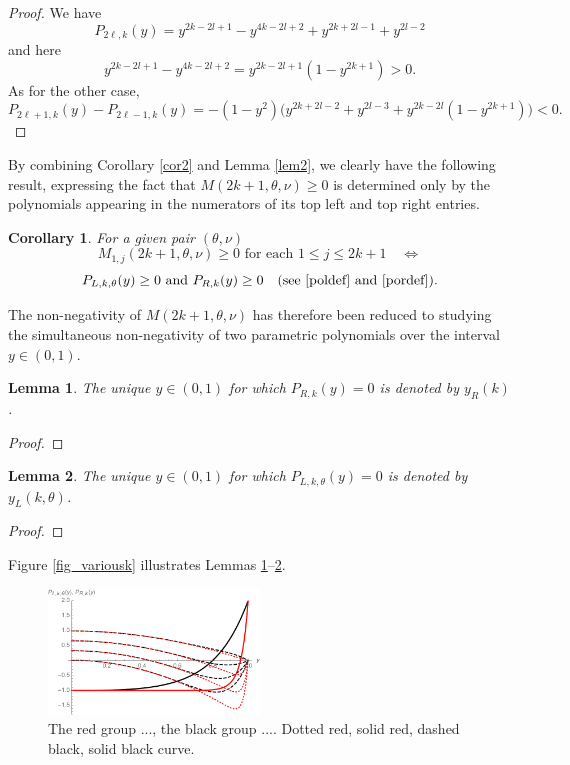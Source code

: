 \documentclass[a4paper]{article}
\newtheorem{lemma}{Lemma}
\newtheorem{corollary}{Corollary}
\newcommand{\te}{\theta}
\newcommand{\yl}{y_L(k,\theta)}
\newcommand{\yr}{y_R(k)}
\newcommand{\Por}{P_{R,k}(y)}
\newcommand{\Pol}{P_{L,k,\te}(y)}
\begin{document}
\begin{proof} We have
\[
P_{2\ell,k}(y)=y^{2 k-2 l+1}-y^{4 k-2 l+2}+y^{2 k+2 l-1}+y^{2 l-2}\]
and here 
\[
y^{2 k-2 l+1}-y^{4 k-2 l+2}=y^{2 k-2 l+1}(1-y^{2 k+1})>0.
\]
As for the other case,
\[
P_{2\ell+1,k}(y)-P_{2\ell-1,k}(y)=-(1 - y^2)\Big(y^{2 k+2 l-2}+y^{2 l-3}+y^{2 k-2 l}(1-y^{2k+1})\Big)<0.
\] 
\end{proof}
By combining Corollary \ref{cor2} and Lemma \ref{lem2}, we clearly have the following result, expressing the fact that $M(2k+1,\te,\nu)\ge 0$ is determined only by the polynomials appearing in the numerators of its top left and top right entries.
\begin{corollary} For a given pair $(\te,\nu)$
\[
M_{1,j}(2k+1,\te,\nu)\ge 0 \text{  for each } 1\le j\le 2k+1 \quad \Longleftrightarrow
\]
\[
\Pol\ge 0 \text{ and }\Por\ge 0\quad\text{(see } \eqref{poldef}\text{ and }\eqref{pordef}\text{)}.
\]
\end{corollary}
The non-negativity of $M(2k+1,\te,\nu)$ has therefore been reduced to studying the simultaneous non-negativity of two parametric polynomials over the interval $y\in(0,1)$.
\begin{lemma}\label{lem3}
The unique $y\in(0,1)$ for which $\Por=0$ is denoted by $\yr$. 
\end{lemma}
\begin{proof}
\end{proof}
\begin{lemma}\label{lem4}
The unique $y\in(0,1)$ for which $\Pol=0$ is denoted by $\yl$. 
\end{lemma}
\begin{proof}
\end{proof}
Figure \ref{fig_variousk} illustrates Lemmas \ref{lem3}--\ref{lem4}.
\begin{figure}
\begin{center}
\includegraphics[width=0.5\textwidth]{fig_someplpr.pdf}
\caption{The red group ..., the black group .... Dotted red, solid red, dashed black, solid black curve.}\label{fig_someplpr}
\end{center}
\end{figure}
\end{document}
